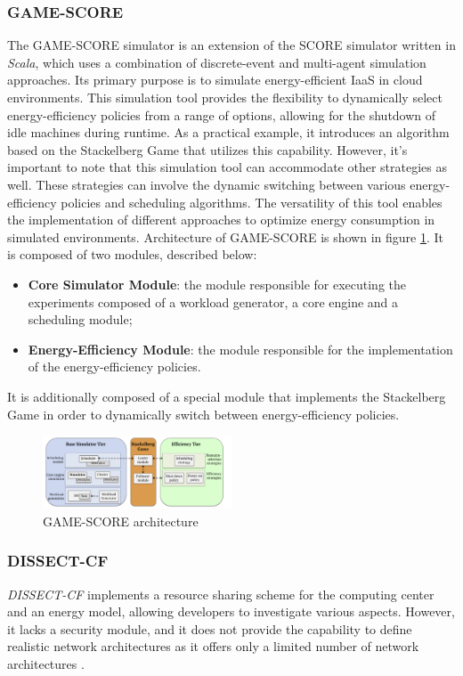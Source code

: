 {\subsubsection*{GAME-SCORE}
The GAME-SCORE simulator is an extension of the SCORE simulator written in \emph{Scala}, which uses a combination of discrete-event and multi-agent simulation approaches. Its primary purpose is to simulate energy-efficient IaaS in cloud environments. This simulation tool provides the flexibility to dynamically select energy-efficiency policies from a range of options, allowing for the shutdown of idle machines during runtime. As a practical example, it introduces an algorithm based on the Stackelberg Game that utilizes this capability. However, it's important to note that this simulation tool can accommodate other strategies as well. These strategies can involve the dynamic switching between various energy-efficiency policies and scheduling algorithms. The versatility of this tool enables the implementation of different approaches to optimize energy consumption in simulated environments.
Architecture of GAME-SCORE is shown in figure \ref{fig:gamescore_arch}. It is composed of two modules, described below:
\begin{itemize}
    \item \textbf{Core Simulator Module}: the module responsible for executing the experiments composed of a workload generator, a core engine and a scheduling module;
    \item \textbf{Energy-Efficiency Module}: the module responsible for the implementation of the energy-efficiency policies.
\end{itemize}
It is additionally composed of a special module that implements the Stackelberg Game in order to dynamically switch between energy-efficiency policies. 
\begin{figure}[h]
    \centering
    \includegraphics[width=0.5\textwidth]{chapters/images/gamescore_arch.png}
    \caption{GAME-SCORE architecture}
    \label{fig:gamescore_arch}
\end{figure}
\subsubsection*{DISSECT-CF}
\emph{DISSECT-CF} \cite{kecskemeti2015dissect} implements a resource sharing scheme for the computing center and an energy model, allowing developers to investigate various aspects. However, it lacks a security module, and it does not provide the capability to define realistic network architectures as it offers only a limited number of network architectures \cite{mansouri2020cloud}.

}
